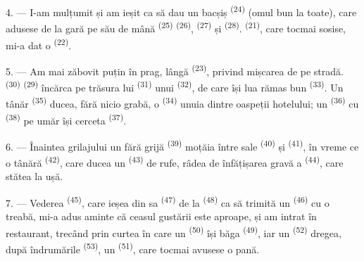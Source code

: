 4. --- I-am mulțumit și am ieșit ca să dau un bacșiș 
\textsuperscript{(24)} (omul bun la toate), care adusese de la gară pe
 său de mână \textsuperscript{(25)}  \textsuperscript{(26)},  \textsuperscript{(27)}
și  \textsuperscript{(28)}. 
\textsuperscript{(21)}, care tocmai sosise, mi-a dat o 
\textsuperscript{(22)}.

5. --- Am mai zăbovit puțin în prag, lângă 
\textsuperscript{(23)}, privind mișcarea de pe stradă. 
\textsuperscript{(30)}  \textsuperscript{(29)} încărca pe
trăsura lui  \textsuperscript{(31)} unui 
\textsuperscript{(32)}, de care își lua rămas bun 
\textsuperscript{(33)}. Un tânăr  \textsuperscript{(35)} ducea,
fără nicio grabă, o  \textsuperscript{(34)} unuia dintre oaspeții
hotelului; un  \textsuperscript{(36)} cu  \textsuperscript{(38)} pe umăr își cerceta 
\textsuperscript{(37)}.

\VUsaut{4.0mm}
\VUsaut{3.0mm}

6. --- Înaintea grilajului un  fără grijă \textsuperscript{(39)}
moțăia între  sale \textsuperscript{(40)} și  \textsuperscript{(41)}, în vreme ce o tânără 
\textsuperscript{(42)}, care ducea un  \textsuperscript{(43)} de rufe,
râdea de înfățișarea gravă a  \textsuperscript{(44)}, care
stătea la ușă.

7. --- Vederea  \textsuperscript{(45)}, care ieșea din
 sa \textsuperscript{(47)} de la 
\textsuperscript{(48)} ca să trimită un 
\textsuperscript{(46)} cu o treabă, mi-a adus aminte că ceasul gustării este
aproape, și am intrat în restaurant, trecând prin curtea în care un
 \textsuperscript{(50)} își băga 
\textsuperscript{(49)}, iar un  \textsuperscript{(52)} dregea, după
îndrumările  \textsuperscript{(53)}, un  \textsuperscript{(51)}, care tocmai avusese o pană.

